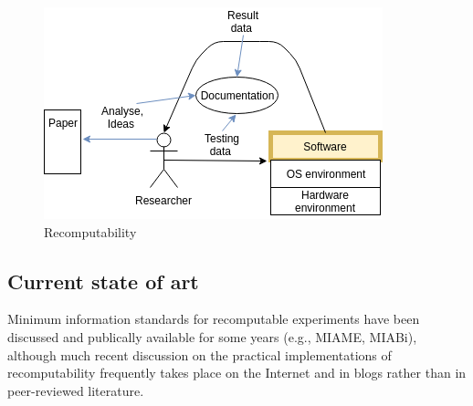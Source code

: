 \begin{figure}[h!]
  \includegraphics[scale=0.8]{fig/recomputability.png}
  \caption{Recomputability\cite{gith}}
  \label{fig:recomputability}
\end{figure}
\subsection{Current state of art}
Minimum information standards for recomputable experiments have been discussed and publically available for some years (e.g.,  MIAME\cite{MIAME}, MIABi\cite{MIABi}), although much recent discussion on the practical implementations of recomputability frequently takes place on the Internet and in blogs rather than in peer-reviewed literature\cite{ivory}\cite{recomputation}\cite{bioinformaticszen}. 
